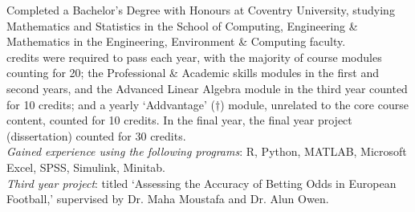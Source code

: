 \documentclass[9pt,a4paper]{article}
\begin{document}
Completed a Bachelor's Degree with Honours at Coventry University, studying Mathematics and Statistics in the School of Computing, Engineering \& Mathematics in the Engineering, Environment \& Computing faculty.\\ credits were required to pass each year, with the majority of course modules counting for 20; the Professional \& Academic skills modules in the first and second years, and the Advanced Linear Algebra module in the third year counted for 10 credits; and a yearly `Addvantage' ($\dagger$) module, unrelated to the core course content, counted for 10 credits. In the final year, the final year project (dissertation) counted for 30 credits.\\\linebreak
\emph{Gained experience using the following programs}: R, Python, MATLAB, Microsoft Excel, SPSS, Simulink, Minitab.\\ \linebreak
\emph{Third year project}: titled `Assessing the Accuracy of Betting Odds in European Football,' supervised by Dr. Maha Moustafa and Dr. Alun Owen. 

\pagebreak
\end{document}
